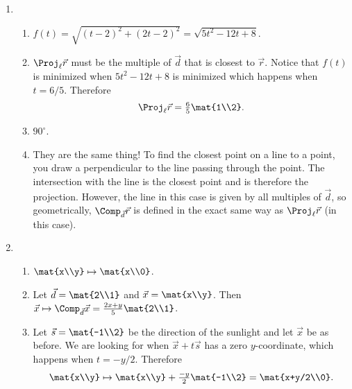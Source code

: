 \begin{enumerate}
\begin{enumerate}
\end{enumerate}

	\item \begin{enumerate}
			\item $f(t) = \sqrt{(t-2)^2+(2t-2)^2} = \sqrt{5t^2-12t+8}$.
			\item $\Proj_\ell \vec r$ must be the multiple of $\vec d$ that is
				closest to $\vec r$. Notice that $f(t)$ is minimized when
				$5t^2-12t+8$ is minimized which happens when $t=6/5$. Therefore
				\[
					\Proj_\ell \vec r = \tfrac{6}{5}\mat{1\\2}.
				\]
			\item $90^\circ$.
			\item They are the same thing! To find the closest point on a line
				to a point, you draw a perpendicular to the line passing through the point.
				The intersection with the line is the closest point and is therefore the projection.
				However, the line in this case is given by
				all multiples of $\vec d$, so geometrically,
				$\Comp_{\vec d}\vec r$ is defined in the exact same way as $\Proj_\ell \vec r$ (in this case).
	\end{enumerate}
		\item  \begin{enumerate}
				\item $\mat{x\\y}\mapsto \mat{x\\0}$.
			\item Let $\vec d=\mat{2\\1}$ and $\vec x=\mat{x\\y}$.
				Then $\vec x\mapsto \Comp_{\vec d}\vec x = \frac{2x+y}{5}\mat{2\\1}$.
			\item Let $\vec s=\mat{-1\\2}$ be the direction of the sunlight and let $\vec x$ be as before.
				We are looking for when $\vec x+t\vec s$ has a zero $y$-coordinate, which happens when
				$t=-y/2$. Therefore
				\[
					\mat{x\\y}\mapsto \mat{x\\y}+\tfrac{-y}{2}\mat{-1\\2} = \mat{x+y/2\\0}.
				\]
		\end{enumerate}

		\end{enumerate}
	

